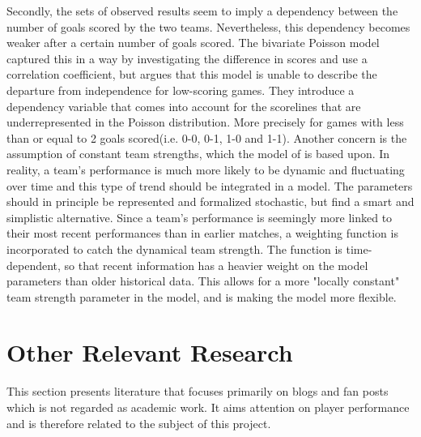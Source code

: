 \newpar
Secondly, the sets of observed results seem to imply a dependency between the number of goals scored by the two teams. Nevertheless, this dependency becomes weaker after a certain number of goals scored. The bivariate Poisson model captured this in a way by investigating the difference in scores and use a correlation coefficient, but \cite{Dixon} argues that this model is unable to describe the departure from independence for low-scoring games. They introduce a dependency variable that comes into account for the scorelines that are underrepresented in the Poisson distribution. More precisely for games with less than or equal to 2 goals scored(i.e. 0-0, 0-1, 1-0 and 1-1). 
\newpar
Another concern is the assumption of constant team strengths, which the model of \cite{Maher} is based upon. In reality, a team's performance is much more likely to be dynamic and fluctuating over time and this type of trend should be integrated in a model. The parameters should in principle be represented and formalized stochastic, but \cite{Dixon} find a smart and simplistic alternative. Since a team's performance is seemingly more linked to their most recent performances than in earlier matches, a weighting function is incorporated to catch the dynamical team strength. The function is time-dependent, so that recent information has a heavier weight on the model parameters than older historical data. This allows for a more "locally constant" team strength parameter in the model, and is making the model more flexible.  

\section{Other Relevant Research} \label{other_relevant_research}

This section presents literature that focuses primarily on blogs and fan posts which is not regarded as academic work. It aims attention on player performance and is therefore related to the subject of this project. 

